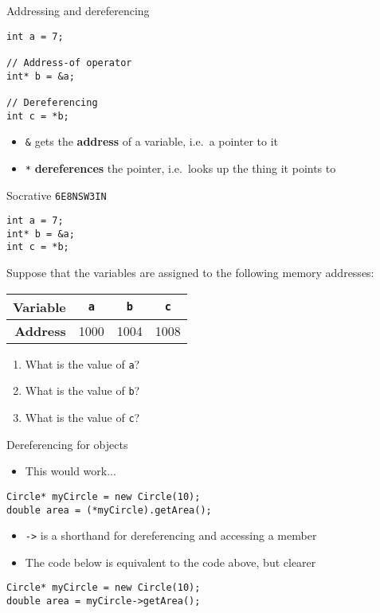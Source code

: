 \begin{frame}[fragile]{Addressing and dereferencing}
    \begin{lstlisting}
int a = 7;

// Address-of operator
int* b = &a;

// Dereferencing
int c = *b;
    \end{lstlisting}
    \pause
    \begin{itemize}
        \item \lstinline{&} gets the \textbf{address} of a variable, i.e.\ a pointer to it
        \item \lstinline{*} \textbf{dereferences} the pointer, i.e.\ looks up the thing it points to
    \end{itemize}
\end{frame}

\begin{frame}[fragile]{Socrative \texttt{6E8NSW3IN}}
    \begin{lstlisting}
int a = 7;
int* b = &a;
int c = *b;
    \end{lstlisting}
    Suppose that the variables are assigned to the following memory addresses:
    \begin{center}
        \begin{tabular}{r|ccc}
            \textbf{Variable} & {\lstinline!a!} & {\lstinline!b!} & {\lstinline!c!} \\ \hline
            \textbf{Address} & 1000 & 1004 & 1008
        \end{tabular}
    \end{center}
    \pause
    \begin{enumerate}
        \item What is the value of \lstinline{a}? \pause
        \item What is the value of \lstinline{b}? \pause
        \item What is the value of \lstinline{c}?
    \end{enumerate}
\end{frame}

\begin{frame}[fragile]{Dereferencing for objects}
    \begin{itemize}
        \item This would work...
    \end{itemize}
    \begin{lstlisting}
Circle* myCircle = new Circle(10);
double area = (*myCircle).getArea();
    \end{lstlisting}
    \pause
    \begin{itemize}
        \item \lstinline{->} is a shorthand for dereferencing and accessing a member \pause
        \item The code below is equivalent to the code above, but clearer
    \end{itemize}
    \begin{lstlisting}
Circle* myCircle = new Circle(10);
double area = myCircle->getArea();
    \end{lstlisting}
\end{frame}

